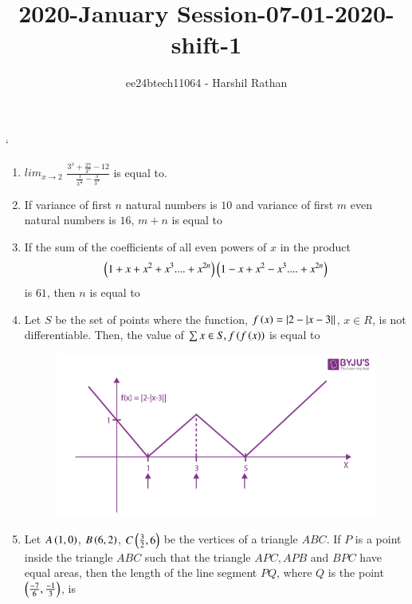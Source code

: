 \documentclass[journal,12pt,twocolumn]{IEEEtran}
\theoremstyle{remark}
\begin{document}

\vspace{3cm}

\title{2020-January Session-07-01-2020-shift-1}
\author{ee24btech11064 - Harshil Rathan}
\maketitle
\newpage
\bigskip

\renewcommand{\thefigure}{\theenumi}
`\renewcommand{\thetable}{\theenumi}
\begin{enumerate}
\item $lim_{x \rightarrow 2}$ $\frac{3^x+\frac{27}{3^x}-12}{\frac{1}{3^\frac{x}{2}}-\frac{3}{3^x}}$ is equal to.\\
\item If variance of first $n$ natural numbers is $10$ and variance of first $m$ even natural numbers is $16$, $m + n$ is equal to\\
\item  If the sum of the coefficients of all even powers of $x$ in the product
\begin{align*}
    \left(1+x+x^2+x^3... . +x^{2n}\right)\left(1-x+x^2-x^3... . +x^{2n}\right)
\end{align*}
is $61$, then $n$ is equal to \\
\item Let $S$ be the set of points where the function, $f\left(x\right)=|2-|x-3||$, $x \in R$, is not differentiable. Then, the value of $\sum x \in S, f\left(f\left(x\right)\right)$ is equal to
\begin{figure}[h!]
   \centering
   \includegraphics[width=\linewidth]{q24.png}
   \caption{}
\end{figure}
\item Let $A\left(1,0\right)$, $B\left(6,2\right)$, $C\left(\frac{3}{2},6\right)$ be the vertices of a triangle $ABC$. If $P$ is a point inside the triangle $ABC$ such that the triangle $APC,APB$ and $BPC$ have equal areas, then the length of the line segment $PQ$, where $Q$ is the point $\left(\frac{-7}{6},\frac{-1}{3}\right)$, is 
\end{enumerate}
\end{document}

